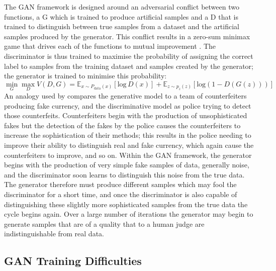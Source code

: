 \documentclass[a4paper, titlepage]{article}
\begin{document}
The \ac{GAN} framework is designed around an adversarial conflict between two functions, a \ac{G} which is trained to produce artificial samples and a \ac{D} that is trained to distinguish between true samples from a dataset and the artificial samples produced by the generator.
This conflict results in a zero-sum minimax game that drives each of the functions to mutual improvement \citep{2014arXiv1406.2661G}.
\newline
\newline
The discriminator is thus trained to maximise the probability of assigning the correct label to samples from the training dataset and samples created by the generator; the generator is trained to minimise this probability:
\newline
%
\begin{equation}
  \min_{G} \max_{D} V(D,G) = \mathbb{E}_{x \sim P_\mathrm{data}(x)}[\mathrm{log}\,D(x)] + \mathbb{E}_{z \sim p_z(z)}[\mathrm{log} (1 - D(G(z)))]
\end{equation}
%
\newline
An analogy used by \citeauthor{2014arXiv1406.2661G} compares the generative model to a team of counterfeiters producing fake currency, and the discriminative model as police trying to detect those counterfeits.
Counterfeiters begin with the production of unsophisticated fakes but the detection of the fakes by the police causes the counterfeiters to increase the sophistication of their methods; this results in the police needing to improve their ability to distinguish real and fake currency, which again cause the counterfeiters to improve, and so on.
\newline
\newline
Within the \ac{GAN} framework, the generator begins with the production of very simple fake samples of data, generally noise, and the discriminator soon learns to distinguish this noise from the true data.
The generator therefore must produce different samples which may fool the discriminator for a short time, and once the discriminator is also capable of distinguishing these slightly more sophisticated samples from the true data the cycle begins again.
\newline
\newline
Over a large number of iterations the generator may begin to generate samples that are of a quality that to a human judge are indistinguishable from real data.

\subsection{GAN Training Difficulties}
\end{document}
